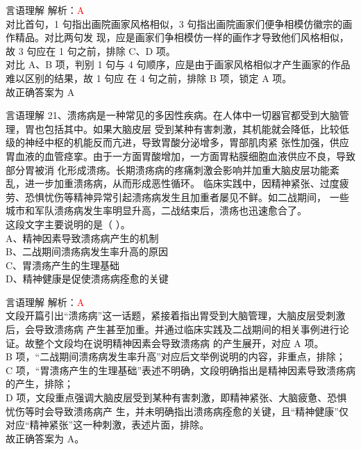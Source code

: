 \documentclass[aspectratio=169]{beamer}
\begin{document}
\begin{frame}[t]{言语理解}
    解析：\textcolor{red}{A}\\
    对比首句，1 句指出画院画家风格相似，3 句指出画院画家们便争相模仿徽宗的画作精品。对比两句发
    现，应是画家们争相模仿一样的画作才导致他们风格相似，故 3 句应在 1 句之前，排除 C、D 项。\\
    对比 A、B 项，判别 1 句与 4 句顺序，应是由于画家风格相似才产生画家的作品难以区别的结果，故 1 句应
    在 4 句之前，排除 B 项，锁定 A 项。\\
    故正确答案为 A
\end{frame}





\begin{frame}[t]{言语理解}
    21、溃疡病是一种常见的多因性疾病。在人体中一切器官都受到大脑管理，胃也包括其中。如果大脑皮层
    受到某种有害刺激，其机能就会降低，比较低级的神经中枢的机能反而亢进，导致胃酸分泌增多，胃部肌肉紧
    张性加强，供应胃血液的血管痉挛。由于一方面胃酸增加，一方面胃粘膜细胞血液供应不良，导致部分胃被消
    化形成溃疡。长期溃疡病的疼痛刺激会影响并加重大脑皮层功能紊乱，进一步加重溃疡病，从而形成恶性循环。
    临床实践中，因精神紧张、过度疲劳、恐惧忧伤等精神异常引起溃疡病发生且加重者屡见不鲜。如二战期间，
    一些城市和军队溃疡病发生率明显升高，二战结束后，溃疡也迅速愈合了。\\
    这段文字主要说明的是（ ）。\\
    A、精神因素导致溃疡病产生的机制\\
    B、二战期间溃疡病发生率升高的原因\\
    C、胃溃疡产生的生理基础\\
    D、精神健康是促使溃疡病痊愈的关键\\
\end{frame}


\begin{frame}[t]{言语理解}
    解析：\textcolor{red}{A}\\
    文段开篇引出“溃疡病”这一话题，紧接着指出胃受到大脑管理，大脑皮层受刺激后，会导致溃疡病
    产生甚至加重。并通过临床实践及二战期间的相关事例进行论证。故整个文段均在说明精神因素会导致溃疡病
    的产生展开，对应 A 项。\\
    B 项，“二战期间溃疡病发生率升高”对应后文举例说明的内容，非重点，排除；\\
    C 项，“胃溃疡产生的生理基础”表述不明确，文段明确指出是精神因素导致溃疡病的产生，排除；\\
    D 项，文段重点强调大脑皮层受到某种有害刺激，即精神紧张、大脑疲惫、恐惧忧伤等时会导致溃疡病产
    生，并未明确指出溃疡病痊愈的关键，且“精神健康”仅对应“精神紧张”这一种刺激，表述片面，排除。\\
    故正确答案为 A。\\
\end{frame}
\end{document}
